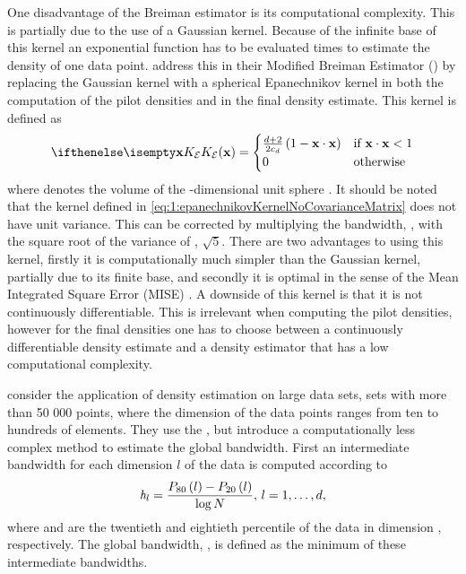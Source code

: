 	One disadvantage of the Breiman estimator is its computational complexity. This is partially due to the use of a Gaussian kernel. Because of the infinite base of this kernel an exponential function has to be evaluated \varNumPatterns times to estimate the density of one data point. 
	\textcite{wilkinson1995dataplot} address this in their Modified Breiman Estimator (\mbe) by replacing the Gaussian kernel with a spherical Epanechnikov kernel in both the computation of the pilot densities and in the final density estimate. This kernel is defined as
	\begin{equation}\label{eq:1:epanechnikovKernelNoCovarianceMatrix}
		\varKernel[\varEpan]{\varPattern} = 
		\begin{cases}
			\frac{\varDim + 2}{2\varUnitSphere{\varDim}} \left( 1 - \varPattern \cdot \varPattern \right) & \text{if } \varPattern \cdot \varPattern < 1\\
			0 & \text{otherwise}
		\end{cases}
	\end{equation}
	 where \varUnitSphere{\varDim} denotes the volume of the \varDim-dimensional unit sphere \cite{epanechnikov1969non}. It should be noted that the kernel defined in \cref{eq:1:epanechnikovKernelNoCovarianceMatrix} does not have unit variance. This can be corrected by multiplying the bandwidth, \varBandwidth,  with the square root of the variance of \varKernel[\varEpan]{}, \ie $\sqrt{5}$. There are two advantages to using this kernel, firstly it is computationally much simpler than the Gaussian kernel, partially due to its finite base, and secondly it is optimal in the sense of the Mean Integrated Square Error (MISE) \cite{epanechnikov1969non}. A downside of this kernel is that it is not continuously differentiable. This is irrelevant when computing the pilot densities, however for the final densities one has to choose between a continuously differentiable density estimate and a density estimator that has a low computational complexity.

	\textcite{ferdosi2011comparison} consider the application of density estimation on large data sets, \ie sets with more than 50 000 points, where the dimension of the data points ranges from ten to hundreds of elements. They use the \mbe, but introduce a computationally less complex method to estimate the global bandwidth. First an intermediate bandwidth for each dimension $l$ of the data is computed according to		
	\begin{equation}\label{eq:1:ferdosiGeneralBandwidth}
			\mathit{h}_{l} = \frac{P_{80}\left( l \right) - P_{20}\left( l \right)}{\log N}, \, l = 1, \dotsc, d,
		\end{equation}
	where  and  are the twentieth and eightieth percentile of the data in dimension \itDim, respectively. The global bandwidth, \varBandwidth, is defined as the minimum of these intermediate bandwidths.

